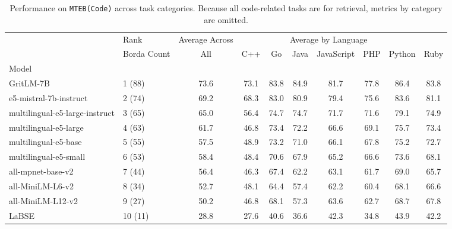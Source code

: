 
\begin{table*}
{\small
\setlength{\tabcolsep}{2pt}
\centering
\begin{tabular}{llc|ccccccc}
\toprule
& Rank & Average Across & \multicolumn{6}{c}{Average by Language} \\
& Borda Count & All & C++ & Go & Java & JavaScript & PHP & Python & Ruby \\
Model & & & & & & & \\
\midrule
GritLM-7B & 1 (88) & 73.6 & 73.1 & 83.8 & 84.9 & 81.7 & 77.8 & 86.4 & 83.8 \\
e5-mistral-7b-instruct & 2 (74) & 69.2 & 68.3 & 83.0 & 80.9 & 79.4 & 75.6 & 83.6 & 81.1 \\
multilingual-e5-large-instruct & 3 (65) & 65.0 & 56.4 & 74.7 & 74.7 & 71.7 & 71.6 & 79.1 & 74.9 \\
multilingual-e5-large & 4 (63) & 61.7 & 46.8 & 73.4 & 72.2 & 66.6 & 69.1 & 75.7 & 73.4 \\
multilingual-e5-base & 5 (55) & 57.5 & 48.9 & 73.2 & 71.0 & 66.1 & 67.8 & 75.2 & 72.7 \\
multilingual-e5-small & 6 (53) & 58.4 & 48.4 & 70.6 & 67.9 & 65.2 & 66.6 & 73.6 & 68.1 \\
all-mpnet-base-v2 & 7 (44) & 56.4 & 46.3 & 67.4 & 62.2 & 63.1 & 61.7 & 69.0 & 65.7 \\
all-MiniLM-L6-v2 & 8 (34) & 52.7 & 48.1 & 64.4 & 57.4 & 62.2 & 60.4 & 68.1 & 66.6 \\
all-MiniLM-L12-v2 & 9 (27) & 50.2 & 46.8 & 68.1 & 57.3 & 63.6 & 62.7 & 68.7 & 67.8 \\
LaBSE & 10 (11) & 28.8 & 27.6 & 40.6 & 36.6 & 42.3 & 34.8 & 43.9 & 42.2 \\
\bottomrule
\end{tabular}
\caption{
Performance on \texttt{MTEB(Code)} across task categories.
Because all code-related tasks are for retrieval, metrics by category are omitted.
}
\label{tab:mteb_code_results}
}
\end{table*}